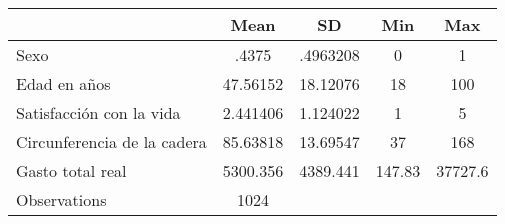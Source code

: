 {
\def\sym#1{\ifmmode^{#1}\else\(^{#1}\)\fi}
\begin{tabular}{l*{1}{cccc}}
\hline\hline
                    &        Mean&          SD&         Min&         Max\\
\hline
Sexo                &       .4375&    .4963208&           0&           1\\
Edad en años        &    47.56152&    18.12076&          18&         100\\
Satisfacción con la vida&    2.441406&    1.124022&           1&           5\\
Circunferencia de la cadera&    85.63818&    13.69547&          37&         168\\
Gasto total real    &    5300.356&    4389.441&      147.83&     37727.6\\
\hline
Observations        &        1024&            &            &            \\
\hline\hline
\end{tabular}
}

